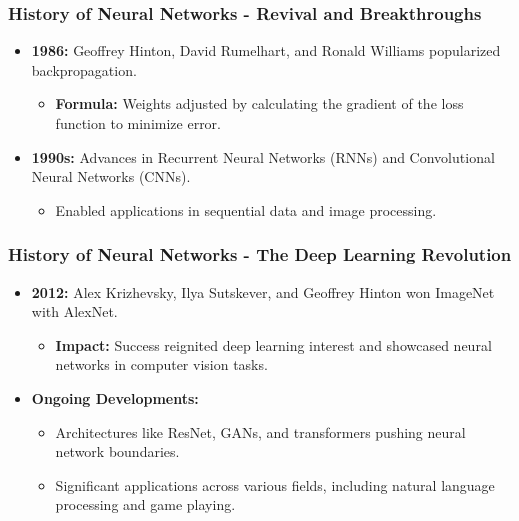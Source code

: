 \documentclass[aspectratio=169]{beamer}
\begin{document}
\begin{frame}[fragile]
    \frametitle{History of Neural Networks - Revival and Breakthroughs}
    \begin{itemize}
        \item \textbf{1986:} Geoffrey Hinton, David Rumelhart, and Ronald Williams popularized backpropagation.
        \begin{itemize}
            \item \textbf{Formula:} Weights adjusted by calculating the gradient of the loss function to minimize error.
        \end{itemize}
        
        \item \textbf{1990s:} Advances in Recurrent Neural Networks (RNNs) and Convolutional Neural Networks (CNNs).
        \begin{itemize}
            \item Enabled applications in sequential data and image processing.
        \end{itemize}
    \end{itemize}
\end{frame}

\begin{frame}[fragile]
    \frametitle{History of Neural Networks - The Deep Learning Revolution}
    \begin{itemize}
        \item \textbf{2012:} Alex Krizhevsky, Ilya Sutskever, and Geoffrey Hinton won ImageNet with AlexNet.
        \begin{itemize}
            \item \textbf{Impact:} Success reignited deep learning interest and showcased neural networks in computer vision tasks.
        \end{itemize}

        \item \textbf{Ongoing Developments:}
        \begin{itemize}
            \item Architectures like ResNet, GANs, and transformers pushing neural network boundaries.
            \item Significant applications across various fields, including natural language processing and game playing.
        \end{itemize}
    \end{itemize}
\end{frame}
\end{document}
